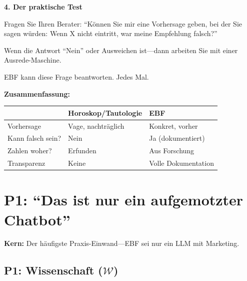 \begin{tcolorbox}[colback=yellow!5!white, colframe=yellow!75!black,
    title=W1-$\mathcal{P}$-L: Lang (Praxis)]
\textbf{4. Der praktische Test}

Fragen Sie Ihren Berater: ``Können Sie mir eine Vorhersage geben, bei der Sie sagen würden: Wenn X nicht eintritt, war meine Empfehlung falsch?''

Wenn die Antwort ``Nein'' oder Ausweichen ist---dann arbeiten Sie mit einer Ausrede-Maschine.

EBF kann diese Frage beantworten. Jedes Mal.

\textbf{Zusammenfassung:}

\begin{center}
\begin{tabular}{lll}
& \textbf{Horoskop/Tautologie} & \textbf{EBF} \\
\midrule
Vorhersage & Vage, nachträglich & Konkret, vorher \\
Kann falsch sein? & Nein & Ja (dokumentiert) \\
Zahlen woher? & Erfunden & Aus Forschung \\
Transparenz & Keine & Volle Dokumentation \\
\end{tabular}
\end{center}

\end{tcolorbox}

\section{P1: ``Das ist nur ein aufgemotzter Chatbot''}
\label{sec:da2-p1}

\begin{tcolorbox}[colback=red!5!white, colframe=red!75!black,
    title=P1: ``Am Ende fragt ihr einfach ChatGPT'']
\textbf{Kern:} Der häufigste Praxis-Einwand---EBF sei nur ein LLM mit Marketing.
\end{tcolorbox}

\subsection{P1: Wissenschaft ($\mathcal{W}$)}

